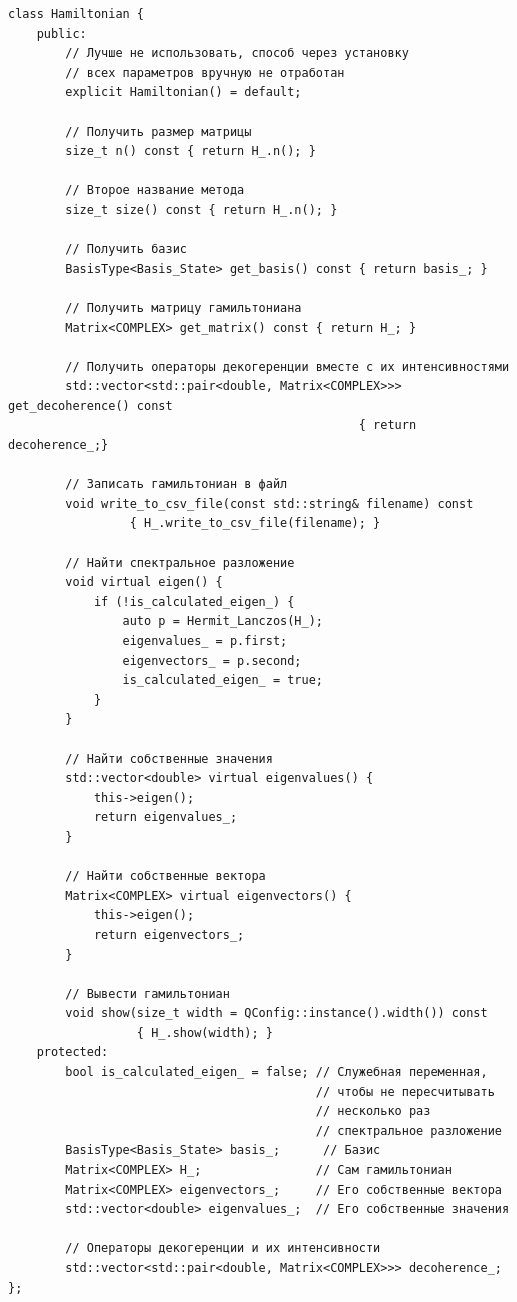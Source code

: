 \documentclass[12pt,fleqn]{article}
\begin{document}
\begin{mdframed}[linecolor=black, topline=true, bottomline=true,
    leftline=false, rightline=false]
\begin{verbatim}
class Hamiltonian {
    public:
        // Лучше не использовать, способ через установку
        // всех параметров вручную не отработан
        explicit Hamiltonian() = default;

        // Получить размер матрицы
        size_t n() const { return H_.n(); }

        // Второе название метода
        size_t size() const { return H_.n(); }

        // Получить базис
        BasisType<Basis_State> get_basis() const { return basis_; }

        // Получить матрицу гамильтониана
        Matrix<COMPLEX> get_matrix() const { return H_; }

        // Получить операторы декогеренции вместе с их интенсивностями
        std::vector<std::pair<double, Matrix<COMPLEX>>> get_decoherence() const
                                                 { return decoherence_;}

        // Записать гамильтониан в файл
        void write_to_csv_file(const std::string& filename) const
                 { H_.write_to_csv_file(filename); }

        // Найти спектральное разложение
        void virtual eigen() {
            if (!is_calculated_eigen_) {
                auto p = Hermit_Lanczos(H_);
                eigenvalues_ = p.first;
                eigenvectors_ = p.second;
                is_calculated_eigen_ = true;
            }
        }

        // Найти собственные значения
        std::vector<double> virtual eigenvalues() {
            this->eigen();
            return eigenvalues_;
        }

        // Найти собственные вектора
        Matrix<COMPLEX> virtual eigenvectors() {
            this->eigen();
            return eigenvectors_;
        }

        // Вывести гамильтониан
        void show(size_t width = QConfig::instance().width()) const
                  { H_.show(width); }
    protected:
        bool is_calculated_eigen_ = false; // Служебная переменная,
                                           // чтобы не пересчитывать
                                           // несколько раз
                                           // спектральное разложение
        BasisType<Basis_State> basis_;      // Базис
        Matrix<COMPLEX> H_;                // Сам гамильтониан
        Matrix<COMPLEX> eigenvectors_;     // Его собственные вектора
        std::vector<double> eigenvalues_;  // Его собственные значения

        // Операторы декогеренции и их интенсивности
        std::vector<std::pair<double, Matrix<COMPLEX>>> decoherence_;
};

\end{verbatim}
\end{mdframed}
\end{document}
